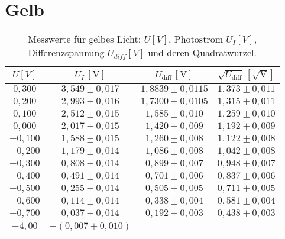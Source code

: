 \section{Gelb}
\begin{table}[h!]
    \centering
    \begin{tabular}{cccc}
    \hline
    $U [V]$ & $U_I \, [\mathrm{V}]$ & $U_{\text{diff}} \, [\mathrm{V}]$ & $\sqrt{U_{\text{diff}}} \, [\mathrm{\sqrt{V}}]$ \\
    \hline
    $0,300$ & $3,549 \pm 0,017$ & $1,8839 \pm 0,0115$ & $1,373 \pm 0,011$ \\
    $0,200$ & $2,993 \pm 0,016$ & $1,7300 \pm 0,0105$ & $1,315 \pm 0,011$ \\
    $0,100$ & $2,512 \pm 0,015$ & $1,585 \pm 0,010$ & $1,259 \pm 0,010$ \\
    $0,000$ & $2,017 \pm 0,015$ & $1,420 \pm 0,009$ & $1,192 \pm 0,009$ \\
    $-0,100$ & $1,588 \pm 0,015$ & $1,260 \pm 0,008$ & $1,122 \pm 0,008$ \\
    $-0,200$ & $1,179 \pm 0,014$ & $1,086 \pm 0,008$ & $1,042 \pm 0,008$ \\
    $-0,300$ & $0,808 \pm 0,014$ & $0,899 \pm 0,007$ & $0,948 \pm 0,007$ \\
    $-0,400$ & $0,491 \pm 0,014$ & $0,701 \pm 0,006$ & $0,837 \pm 0,006$ \\
    $-0,500$ & $0,255 \pm 0,014$ & $0,505 \pm 0,005$ & $0,711 \pm 0,005$ \\
    $-0,600$ & $0,114 \pm 0,014$ & $0,338 \pm 0,004$ & $0,581 \pm 0,004$ \\
    $-0,700$ & $0,037 \pm 0,014$ & $0,192 \pm 0,003$ & $0,438 \pm 0,003$ \\
    $-4,00$ & $-(0,007 \pm 0,010)$ & & \\
    \hline
    \end{tabular}
    \caption{Messwerte für gelbes Licht: $U [V]$, Photostrom $U_I [V]$, Differenzspannung $U_{diff} [V]$ und deren Quadratwurzel.}
    \label{tab:gelb_values}
\end{table}


\twocolumn
